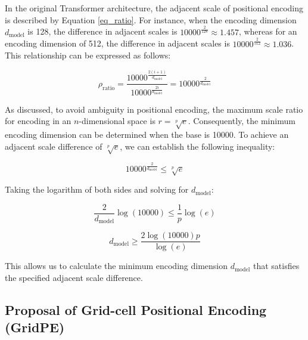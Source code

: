 \documentclass[letterpaper]{article} %
\begin{document}
In the original Transformer architecture, the adjacent scale of positional encoding is described by Equation \ref{eq_ratio}. For instance, when the encoding dimension \(d_{\text{model}}\) is 128, the difference in adjacent scales is \(10000^{\frac{2}{128}} \approx 1.457\), whereas for an encoding dimension of 512, the difference in adjacent scales is \(10000^{\frac{2}{512}} \approx 1.036\). This relationship can be expressed as follows:

\begin{equation}
\label{eq_ratio}
\rho_{\text{ratio}} = \frac{10000^{\frac{2(i+1)}{d_{\text{model}}}}}{10000^{\frac{2i}{d_{\text{model}}}}} = 10000^{\frac{2}{d_{\text{model}}}}
\end{equation}

As discussed, to avoid ambiguity in positional encoding, the maximum scale ratio for encoding in an \(n\)-dimensional space is \(r = \sqrt[p]{e}\). Consequently, the minimum encoding dimension can be determined when the base is 10000. To achieve an adjacent scale difference of \( \sqrt[p]{e} \), we can establish the following inequality:

\begin{equation}
10000^{\frac{2}{d_{\text{model}}}} \leq \sqrt[p]{e}
\end{equation}

Taking the logarithm of both sides and solving for \(d_{\text{model}}\):

\begin{equation}
\frac{2}{d_{\text{model}}} \log(10000) \leq \frac{1}{p} \log(e)
\end{equation}

\begin{equation}
d_{\text{model}} \geq \frac{2 \log(10000) p}{\log(e)}
\end{equation}

This allows us to calculate the minimum encoding dimension \(d_{\text{model}}\) that satisfies the specified adjacent scale difference.


\subsection{Proposal of Grid-cell Positional Encoding (GridPE)}
\end{document}
